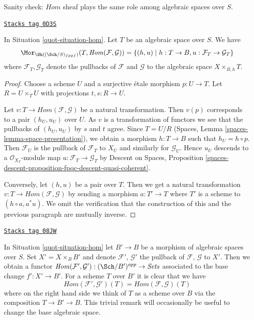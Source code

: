Sanity check: $\mathit{Hom}$ sheaf plays the same role among algebraic spaces
over $S$.

\begin{lemma}
\label{quot-lemma-extend-hom-to-spaces}
\href{https://stacks.math.columbia.edu/tag/0D3S}{\texttt{Stacks tag 0D3S}}

In Situation \ref{quot-situation-hom}. Let $T$ be an algebraic space over $S$.
We have
$$
\Mor_{\Sh((\Sch/S)_{fppf})}(T, \mathit{Hom}(\mathcal{F}, \mathcal{G})) =
\{(h, u) \mid h : T \to B, u : \mathcal{F}_T \to \mathcal{G}_T\}
$$
where $\mathcal{F}_T, \mathcal{G}_T$ denote the pullbacks of $\mathcal{F}$
and $\mathcal{G}$ to the algebraic space $X \times_{B, h} T$.
\end{lemma}

\begin{proof}
Choose a scheme $U$ and a surjective \'etale morphism $p : U \to T$.
Let $R = U \times_T U$ with projections $t, s : R \to U$.

\medskip\noindent
Let $v : T \to \mathit{Hom}(\mathcal{F}, \mathcal{G})$
be a natural transformation. Then $v(p)$ corresponds to a pair
$(h_U, u_U)$ over $U$. As $v$ is a transformation of functors we see
that the pullbacks of $(h_U, u_U)$ by $s$ and $t$ agree.
Since $T = U/R$ (Spaces, Lemma \ref{spaces-lemma-space-presentation}),
we obtain a morphism $h : T \to B$ such that
$h_U = h \circ p$. Then $\mathcal{F}_U$ is the pullback of
$\mathcal{F}_T$ to $X_U$ and similarly for $\mathcal{G}_U$.
Hence $u_U$ descends to a $\mathcal{O}_{X_T}$-module map
$u : \mathcal{F}_T \to \mathcal{G}_T$ by
Descent on Spaces, Proposition
\ref{spaces-descent-proposition-fpqc-descent-quasi-coherent}.

\medskip\noindent
Conversely, let $(h, u)$ be a pair over $T$. Then we get a natural
transformation $v : T \to \mathit{Hom}(\mathcal{F}, \mathcal{G})$
by sending a morphism $a : T' \to T$ where $T'$ is a scheme
to $(h \circ a, a^*u)$. We omit the verification that the construction
of this and the previous paragraph are mutually inverse.
\end{proof}

\begin{remark}
\label{quot-remark-hom-base-change}
\href{https://stacks.math.columbia.edu/tag/08JW}{\texttt{Stacks tag 08JW}}

In Situation \ref{quot-situation-hom} let $B' \to B$ be a morphism of
algebraic spaces over $S$. Set $X' = X \times_B B'$ and denote
$\mathcal{F}'$, $\mathcal{G}'$ the pullback of
$\mathcal{F}$, $\mathcal{G}$ to $X'$. Then we obtain a functor
$\mathit{Hom}(\mathcal{F}', \mathcal{G}') : (\Sch/B')^{opp} \to \textit{Sets}$
associated to the base change $f' : X' \to B'$. For a scheme $T$ over $B'$
it is clear that we have
$$
\mathit{Hom}(\mathcal{F}', \mathcal{G}')(T) =
\mathit{Hom}(\mathcal{F}, \mathcal{G})(T)
$$
where on the right hand side we think of $T$ as a scheme over $B$
via the composition $T \to B' \to B$. This trivial remark
will occasionally be useful to change the base algebraic space.
\end{remark}

